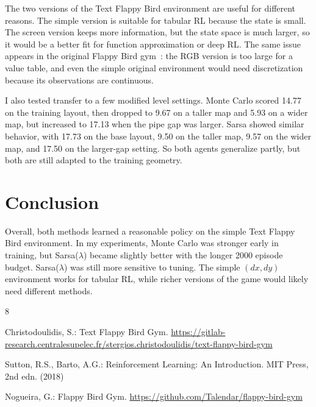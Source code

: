 \documentclass[runningheads]{llncs}
\begin{document}
The two versions of the Text Flappy Bird environment are useful for different
reasons. The simple version is suitable for tabular RL because the state is
small. The screen version keeps more information, but the state space is much
larger, so it would be a better fit for function approximation or deep RL.
The same issue appears in the original Flappy Bird gym~\cite{flappybirdgym}:
the RGB version is too large for a value table, and even the simple original
environment would need discretization because its observations are continuous.

I also tested transfer to a few modified level settings. Monte Carlo scored
14.77 on the training layout, then dropped to 9.67 on a taller map and 5.93 on
a wider map, but increased to 17.13 when the pipe gap was larger. Sarsa showed
similar behavior, with 17.73 on the base layout, 9.50 on the taller map, 9.57
on the wider map, and 17.50 on the larger-gap setting. So both agents
generalize partly, but both are still adapted to the training geometry.

\section{Conclusion}

Overall, both methods learned a reasonable policy on the simple Text Flappy
Bird environment. In my experiments, Monte Carlo was stronger early in
training, but Sarsa($\lambda$) became slightly better with the longer 2000
episode budget. Sarsa($\lambda$) was still more sensitive to tuning. The
simple $(dx,dy)$ environment works for tabular RL, while richer versions of
the game would likely need different methods.

\begin{thebibliography}{8}

Christodoulidis, S.:
Text Flappy Bird Gym.
\url{https://gitlab-research.centralesupelec.fr/stergios.christodoulidis/text-flappy-bird-gym}

Sutton, R.S., Barto, A.G.:
Reinforcement Learning: An Introduction.
MIT Press, 2nd edn. (2018)

Nogueira, G.:
Flappy Bird Gym.
\url{https://github.com/Talendar/flappy-bird-gym}

\end{thebibliography}
\end{document}
